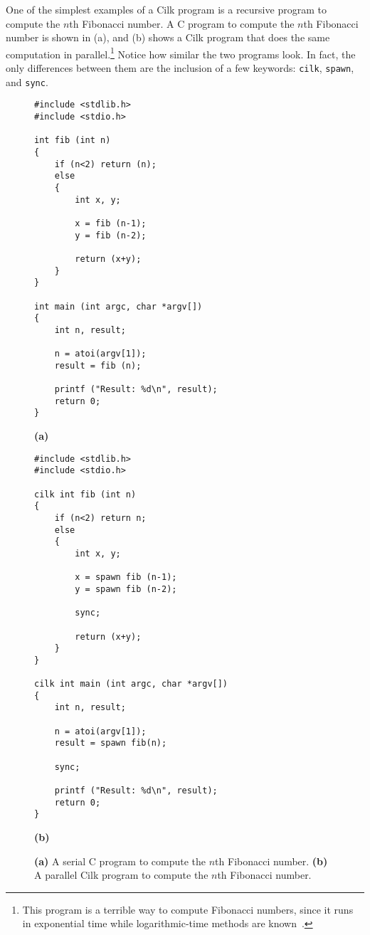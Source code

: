 One of the simplest examples of a Cilk program is a recursive program
to compute the $n$th Fibonacci number.  A C program to compute the
$n$th Fibonacci number is shown in (a), and
(b) shows a Cilk program that does the same computation in
parallel.\footnote{This program is a terrible way to compute Fibonacci
numbers, since it runs in exponential time while logarithmic-time
methods are known~\cite[page 850]{CormenLeRi90}.} Notice how similar
the two programs look.  In fact, the only differences between them are
the inclusion of a few keywords: \texttt{cilk}, \texttt{spawn}, and
\texttt{sync}.

\begin{figure}
\centering
\begin{minipage}{.45\textwidth}
\footnotesize
\begin{verbatim}
#include <stdlib.h>
#include <stdio.h>

int fib (int n)
{ 
    if (n<2) return (n);
    else
    {
        int x, y;

        x = fib (n-1);
        y = fib (n-2);

        return (x+y);
    }
}

int main (int argc, char *argv[])
{
    int n, result;

    n = atoi(argv[1]);
    result = fib (n);

    printf ("Result: %d\n", result);
    return 0;
}
\end{verbatim}
\centerline{\textbf{(a)}}
\end{minipage}\hspace{.05\textwidth}
\begin{minipage}{.4\textwidth}
\footnotesize
\begin{verbatim}
#include <stdlib.h>
#include <stdio.h>

cilk int fib (int n)
{
    if (n<2) return n;
    else
    {
        int x, y;

        x = spawn fib (n-1);
        y = spawn fib (n-2);

        sync;

        return (x+y);
    }
}

cilk int main (int argc, char *argv[])
{
    int n, result;

    n = atoi(argv[1]);
    result = spawn fib(n);

    sync;

    printf ("Result: %d\n", result);
    return 0;
}
\end{verbatim}
\centerline{\textbf{(b)}}
\end{minipage}
\caption{\small \textbf{(a)} A serial C program to compute the $n$th
Fibonacci number.  \textbf{(b)} A parallel Cilk program to compute the
$n$th Fibonacci number.}
\label{fig:fib}
\end{figure}

